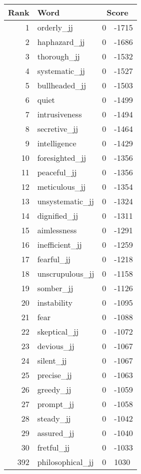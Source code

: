 \begin{longtable}[!htbp]{| rlr@{.}l |}
    \hline
    \textbf{Rank} & \textbf{Word} & \multicolumn{2}{c|}{\textbf{Score}} \\
    \hline
    \endhead
    1 & orderly\_jj & 0 & -1715 \\
    2 & haphazard\_jj & 0 & -1686 \\
    3 & thorough\_jj & 0 & -1532 \\
    4 & systematic\_jj & 0 & -1527 \\
    5 & bullheaded\_jj & 0 & -1503 \\
    6 & quiet & 0 & -1499 \\
    7 & intrusiveness & 0 & -1494 \\
    8 & secretive\_jj & 0 & -1464 \\
    9 & intelligence & 0 & -1429 \\
    10 & foresighted\_jj & 0 & -1356 \\
    11 & peaceful\_jj & 0 & -1356 \\
    12 & meticulous\_jj & 0 & -1354 \\
    13 & unsystematic\_jj & 0 & -1324 \\
    14 & dignified\_jj & 0 & -1311 \\
    15 & aimlessness & 0 & -1291 \\
    16 & inefficient\_jj & 0 & -1259 \\
    17 & fearful\_jj & 0 & -1218 \\
    18 & unscrupulous\_jj & 0 & -1158 \\
    19 & somber\_jj & 0 & -1126 \\
    20 & instability & 0 & -1095 \\
    21 & fear & 0 & -1088 \\
    22 & skeptical\_jj & 0 & -1072 \\
    23 & devious\_jj & 0 & -1067 \\
    24 & silent\_jj & 0 & -1067 \\
    25 & precise\_jj & 0 & -1063 \\
    26 & greedy\_jj & 0 & -1059 \\
    27 & prompt\_jj & 0 & -1058 \\
    28 & steady\_jj & 0 & -1042 \\
    29 & assured\_jj & 0 & -1040 \\
    30 & fretful\_jj & 0 & -1033 \\
    392 & philosophical\_jj & 0 & 1030 \\

\end{longtable}
